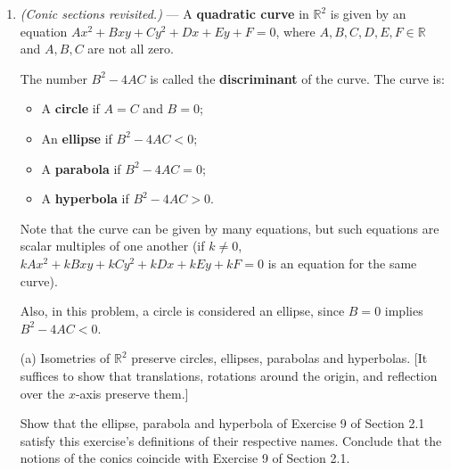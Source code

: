 \documentclass[leqno]{book}
\begin{document}
\begin{enumerate}
(h) The final case to consider is when $\operatorname{im}\varphi=V$; i.e., $\varphi$ is surjective.  In this case, suppose $\ker\varphi=\left<a\right>$, and show that there exists $g\in\varphi^{-1}\left(\begin{bmatrix}1&0\\0&-1\end{bmatrix}\right)$ such that either $g^2=1$ or $g^2=a$.  Show that if $g^2=1$ then $G\cong D(\mathbb Z)\times\mathbb Z/2\mathbb Z$, and if $g^2=a$ then $G\cong D(\mathbb Z)$.  These are the remaining two Frieze groups.

Below are Frieze patterns whose isometry groups are the Frieze groups established in parts (d)-(h).
\begin{center}\texttt{[image: FriezePatterns.png]}\end{center}
\item\emph{(Conic sections revisited.)} \---- A \textbf{quadratic curve} in $\mathbb R^2$ is given by an equation $Ax^2+Bxy+Cy^2+Dx+Ey+F=0$, where $A,B,C,D,E,F\in\mathbb R$ and $A,B,C$ are not all zero.

The number $B^2-4AC$ is called the \textbf{discriminant} of the curve.  The curve is:
\begin{itemize}
\item A \textbf{circle} if $A=C$ and $B=0$;

\item An \textbf{ellipse} if $B^2-4AC<0$;

\item A \textbf{parabola} if $B^2-4AC=0$;

\item A \textbf{hyperbola} if $B^2-4AC>0$.
\end{itemize}
Note that the curve can be given by many equations, but such equations are scalar multiples of one another (if $k\ne 0$, $kAx^2+kBxy+kCy^2+kDx+kEy+kF=0$ is an equation for the same curve).

Also, in this problem, a circle is considered an ellipse, since $B=0$ implies $B^2-4AC<0$.

(a) Isometries of $\mathbb R^2$ preserve circles, ellipses, parabolas and hyperbolas.  [It suffices to show that translations, rotations around the origin, and reflection over the $x$-axis preserve them.]

Show that the ellipse, parabola and hyperbola of Exercise 9 of Section 2.1 satisfy this exercise's definitions of their respective names.  Conclude that the notions of the conics coincide with Exercise 9 of Section 2.1.


\end{enumerate}
\end{document}
